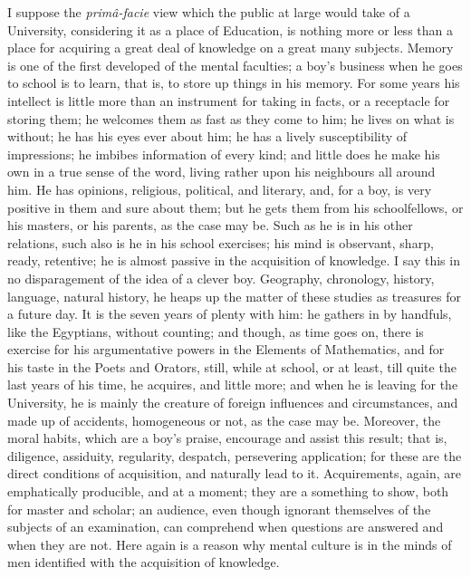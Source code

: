 I suppose the \emph{primâ-facie} view which the public at large
would take of a University, considering it as a place of Education, is
nothing more or less than a place for acquiring a great deal of
knowledge on a great many subjects. Memory is one of the first
developed of the mental faculties; a boy's business when he goes to
school is to learn, that is, to store up things in his memory. For
some years his intellect is little more than an instrument for taking
in facts, or a receptacle for storing them; he welcomes them as fast
as they come to him; he lives on what is without; he has his
eyes ever about him; he has a lively susceptibility of impressions; he
imbibes information of every kind; and little does he make his own in
a true sense of the word, living rather upon his neighbours all around
him. He has opinions, religious, political, and literary, and, for a
boy, is very positive in them and sure about them; but he gets them
from his schoolfellows, or his masters, or his parents, as the case
may be. Such as he is in his other relations, such also is he in his
school exercises; his mind is observant, sharp, ready, retentive; he
is almost passive in the acquisition of knowledge. I say this in no
disparagement of the idea of a clever boy. Geography, chronology,
history, language, natural history, he heaps up the matter of these
studies as treasures for a future day. It is the seven years of plenty
with him: he gathers in by handfuls, like the Egyptians, without
counting; and though, as time goes on, there is exercise for his
argumentative powers in the Elements of Mathematics, and for his taste
in the Poets and Orators, still, while at school, or at least, till
quite the last years of his time, he acquires, and little more; and
when he is leaving for the University, he is mainly the creature of
foreign influences and circumstances, and made up of accidents,
homogeneous or not, as the case may be. Moreover, the moral habits,
which are a boy's praise, encourage and assist this result; that is,
diligence, assiduity, regularity, despatch, persevering application;
for these are the direct conditions of acquisition, and naturally lead
to it. Acquirements, again, are emphatically producible, and at a
moment; they are a something to show, both for master and scholar; an
audience, even though ignorant themselves of the subjects of an
examination, can comprehend when questions are answered and when they
are not. Here again is a reason why mental culture is in the
minds of men identified with the acquisition of knowledge.

